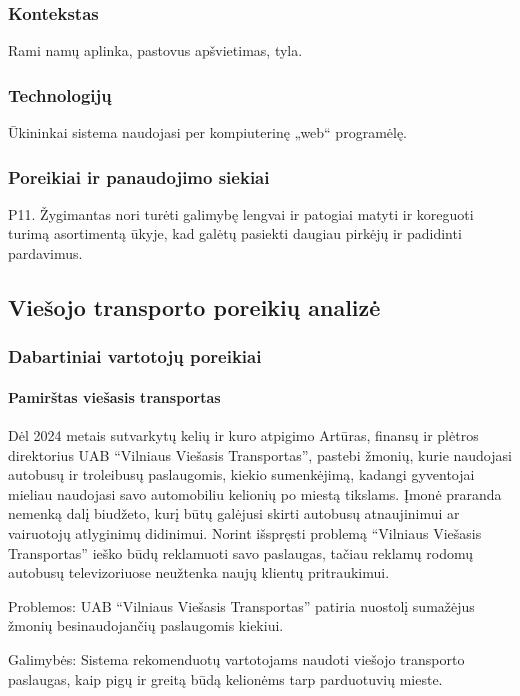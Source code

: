 \documentclass{article}
\begin{document}
\subsubsection*{Kontekstas}
	Rami namų aplinka, pastovus apšvietimas, tyla.
\subsubsection*{Technologijų}	
	Ūkininkai sistema naudojasi per kompiuterinę „web“ programėlę.
\subsubsection{Poreikiai ir panaudojimo siekiai}
	P11. Žygimantas nori turėti galimybę lengvai ir patogiai matyti ir koreguoti turimą asortimentą ūkyje, kad galėtų pasiekti daugiau pirkėjų ir padidinti pardavimus.
	\pagebreak

\subsection{Viešojo transporto poreikių analizė}
\subsubsection{Dabartiniai vartotojų poreikiai}
	\paragraph{Pamirštas viešasis transportas}
		Dėl 2024 metais sutvarkytų kelių ir kuro atpigimo Artūras, finansų ir plėtros direktorius UAB “Vilniaus Viešasis Transportas”, pastebi žmonių, kurie naudojasi autobusų ir troleibusų paslaugomis, kiekio sumenkėjimą, kadangi gyventojai mieliau naudojasi savo automobiliu kelionių po miestą tikslams. Įmonė praranda nemenką dalį biudžeto, kurį būtų galėjusi skirti autobusų atnaujinimui ar vairuotojų atlyginimų didinimui. Norint išspręsti problemą “Vilniaus Viešasis Transportas” ieško būdų reklamuoti savo paslaugas, tačiau reklamų rodomų autobusų televizoriuose neužtenka naujų klientų pritraukimui.\par
	Problemos: UAB “Vilniaus Viešasis Transportas” patiria nuostolį sumažėjus žmonių besinaudojančių paslaugomis kiekiui.\par
	Galimybės: Sistema rekomenduotų vartotojams naudoti viešojo transporto paslaugas, kaip pigų ir greitą būdą kelionėms tarp parduotuvių mieste.
\end{document}
